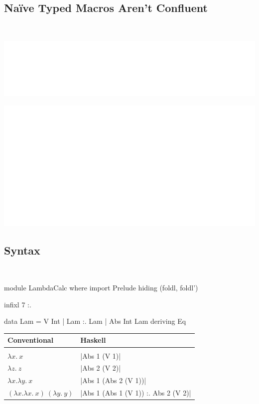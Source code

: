 \documentclass{beamer}
\begin{document}
\subsection{Na\"ive Typed Macros Aren't Confluent}
\begin{frame}[plain]{\insertsectionhead\ \textemdash\\
    \insertsubsectionhead}
  \begin{flushright}
  \includegraphics[width=0.35\linewidth]{figs/macro4.pdf}
  \end{flushright}

  \includegraphics[width=\linewidth]{figs/macro3.pdf}
\end{frame}


\subsection{Syntax}
\begin{frame}{\insertsectionhead\ \textemdash\
    \insertsubsectionhead}
\begin{code}
module LambdaCalc where
import Prelude hiding (foldl, foldl')

infixl 7 :.

data Lam
  = V Int
  | Lam :. Lam
  | Abs Int Lam
  deriving Eq
\end{code}

  \framebreak
    \begin{table}[htbp]
      \begin{tabular}{ll}
        Conventional & Haskell \\
        \hline
        & \\
        $\lambda x.\ x$ & |Abs 1 (V 1)| \\
        $\lambda z.\ z$ & |Abs 2 (V 2)| \\
        $\lambda x. \lambda y.\ x$ & |Abs 1 (Abs 2 (V 1))| \\
        $(\lambda x. \lambda x.\ x)\ (\lambda y.\ y)$ & |Abs 1 (Abs 1 (V 1)) :. Abs 2 (V 2)|
      \end{tabular}
    \end{table}


\end{frame}
\end{document}
